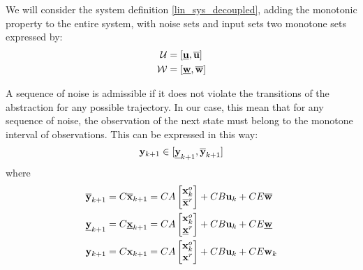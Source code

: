 We will consider the system definition \ref{lin_sys_decoupled}, adding the monotonic property to the entire system, with noise sets and input sets two monotone sets expressed by:
\begin{equation}
\begin{aligned}
\mathcal{U} &= [\underline{ \mathbf{u}},\overline{ \mathbf{u}}]\\
\mathcal{W} &= [\underline{ \mathbf{w}},\overline{ \mathbf{w}}]\\
\end{aligned}
\end{equation}

A sequence of noise is admissible if it does not violate the transitions of the abstraction for any possible trajectory.
In our case, this mean that for any sequence of noise, the observation of the next state must belong to the monotone interval of observations.
This can be expressed in this way:
\begin{equation} \label{valid_transition}
 \mathbf{y}_{k+1} \in [\underline{ \mathbf{y}}_{k+1},\overline{ \mathbf{y}}_{k+1}]
\end{equation}
where 
\begin{align*}
\overline{ \mathbf{y}}_{k+1} &= C \overline{ \mathbf{x}}_{k+1} = 
C A 
\begin{bmatrix}
 \mathbf{x}^o_{k} \\
\overline{ \mathbf{x}}^r
\end{bmatrix}
+ C B  \mathbf{u}_{k} + C E \overline{ \mathbf{w}}
\\
\underline{ \mathbf{y}}_{k+1} &= C \underline{ \mathbf{x}}_{k+1} 
= C A 
\begin{bmatrix}
 \mathbf{x}^o_{k} \\
\underline{ \mathbf{x}}^r
\end{bmatrix}
+ C B  \mathbf{u}_{k} + C E \underline{ \mathbf{w}}
\\
 \mathbf{y}_{k+1} &= C  \mathbf{x}_{k+1}
= C A 
\begin{bmatrix}
 \mathbf{x}^o_{k} \\
 \mathbf{x}^r
\end{bmatrix}
+ C B  \mathbf{u}_{k} + C E  \mathbf{w}_{k}
\end{align*}

